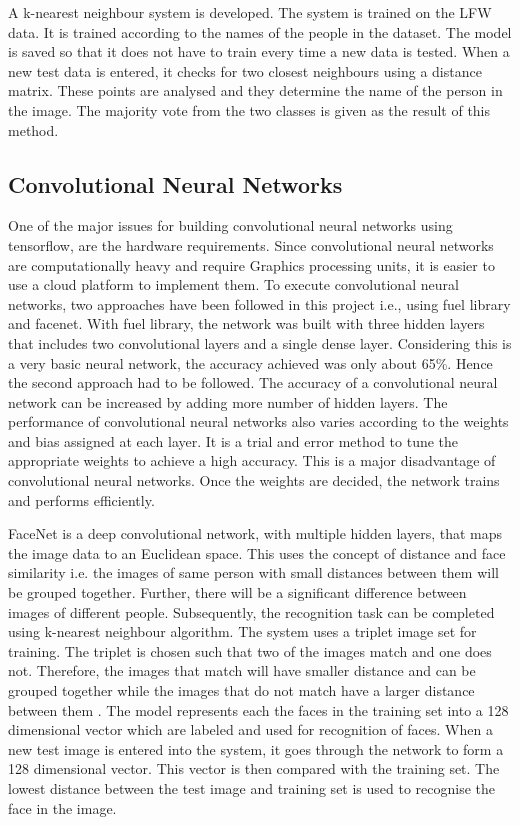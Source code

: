 \documentclass[conference]{IEEEtran}
\begin{document}
A k-nearest neighbour system is developed. The system is trained on the LFW data. It is trained according to the names of the people in the dataset. The model is saved so that it does not have to train every time a new data is tested. When a new test data is entered, it checks for two closest neighbours using a distance matrix. These points are analysed and they determine the name of the person in the image. The majority vote from the two classes is given as the result of this method.
	
\subsection{Convolutional Neural Networks} 
\label{subsec: 4c Convolutional Neural Networks}
One of the major issues for building convolutional neural networks using tensorflow, are the hardware requirements. Since convolutional neural networks are computationally heavy and require Graphics processing units, it is easier to use a cloud platform to implement them. To execute convolutional neural networks, two approaches have been followed in this project i.e., using fuel library and facenet\cite{schroff2015facenet}. With fuel library, the network was built with three hidden layers that includes two convolutional layers and a single dense layer. Considering this is a very basic neural network, the accuracy achieved was only about 65\%. Hence the second approach had to be followed. The accuracy of a convolutional neural network can be increased by adding more number of hidden layers. The performance of convolutional neural networks also varies according to the weights and bias assigned at each layer. It is a trial and error method to tune the appropriate weights to achieve a high accuracy. This is a major disadvantage of convolutional neural networks. Once the weights are decided, the network trains and performs efficiently. 

FaceNet is a deep convolutional network, with multiple hidden layers, that maps the image data to an Euclidean space. This uses the concept of distance and face similarity i.e. the images of same person with small distances between them will be grouped together. Further, there will be a significant difference between images of different people. Subsequently, the recognition task can be completed using k-nearest neighbour algorithm. The system uses a triplet image set for training. The triplet is chosen such that two of the images match and one does not. Therefore, the images that match will have smaller distance and can be grouped together while the images that do not match have a larger distance between them \cite{schroff2015facenet}. The model represents each the faces in the training set into a 128 dimensional vector which are labeled and used for recognition of faces. When a new test image is entered into the system, it goes through the network to form a 128 dimensional vector. This vector is then compared with the training set. The lowest distance between the test image and training set is used to recognise the face in the image. 
\end{document}
